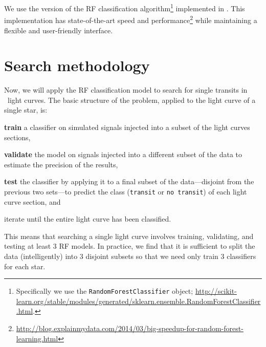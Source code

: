 We use the  \citep{Pedregosa:2011} version of the RF
classification algorithm\footnote{Specifically we use the
\texttt{RandomForestClassifier} object;
\url{http://scikit-learn.org/stable/modules/generated/sklearn.ensemble.RandomForestClassifier.html}.}
implemented in .
This implementation has state-of-the-art speed and
performance\footnote{\url{http://blog.explainmydata.com/2014/03/big-speedup-for-random-forest-learning.html}}
while maintaining a flexible and user-friendly interface.


\section{Search methodology}

Now, we will apply the RF classification model to search for single transits
in \kepler\ light curves.
The basic structure of the problem, applied to the light curve of a single
star, is:
\begin{enumerate}

{\item {\bf train} a classifier on simulated signals injected into a subset of
the light curves sections,}

{\item {\bf validate} the model on signals injected into a different subset of
the data to estimate the precision of the results,}

{\item {\bf test} the classifier by applying it to a final subset of the
data---disjoint from the previous two sets---to predict the class
(\texttt{transit} or \texttt{no transit}) of each light curve section, and}

{\item iterate until the entire light curve has been classified.}

\end{enumerate}
This means that searching a single light curve involves training, validating,
and testing at least 3 RF models.
In practice, we find that it is sufficient to split the data (intelligently)
into 3 disjoint subsets so that we need only train 3 classifiers for each
star.

